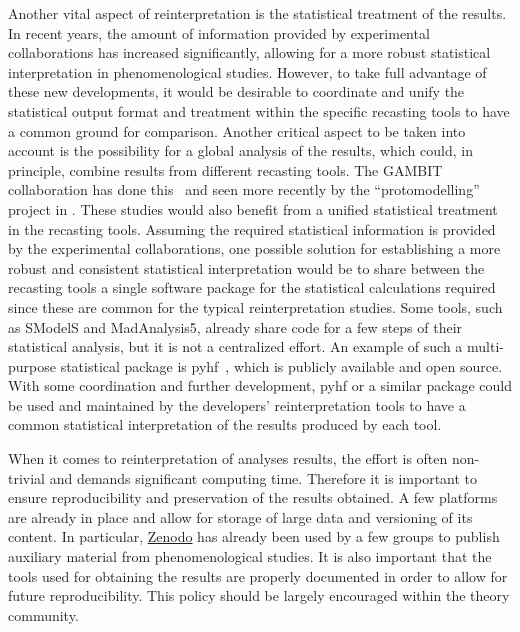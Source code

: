 \documentclass[11pt]{article}
\begin{document}
Another vital aspect of reinterpretation is the statistical treatment of the results. In recent years, the amount of information provided by experimental collaborations has increased significantly, allowing for a more robust statistical interpretation in phenomenological studies. However, to take full advantage of these new developments, it would be desirable to coordinate and unify the statistical output format and treatment within the specific recasting tools to have a common ground for comparison. Another critical aspect to be taken into account is the possibility for a global analysis of the results, which could, in principle, combine results from different recasting tools. The GAMBIT collaboration has done this~\cite{Kvellestad:2019vxm} and seen more recently by the ``protomodelling'' project in \cite{Waltenberger:2020ygp}.
These studies would also benefit from a unified statistical treatment in the recasting tools. Assuming the required statistical information is provided by the experimental collaborations, one possible solution for establishing a more robust and consistent statistical interpretation would be to share between the recasting tools a single software package for the statistical calculations required since these are common for the typical reinterpretation studies.
Some tools, such as SModelS and MadAnalysis5, already share code for a few steps of their statistical analysis, but it is not a centralized effort. An example of such a multi-purpose statistical package is pyhf~\cite{pyhf}, which is publicly available and open source. With some coordination and further development, pyhf or a similar package could be used and maintained by the developers' reinterpretation tools to have a common statistical interpretation of the results produced by each tool.




When it comes to reinterpretation of analyses results, the effort is often non-trivial and demands significant computing time. Therefore it is important to ensure reproducibility and  preservation of the results obtained.
A few platforms are already in place and allow for storage of large data and versioning of its content. In particular, \href{https://zenodo.org/}{Zenodo} has already been used by a few groups to publish auxiliary material from phenomenological studies.
It is also important that the tools used for obtaining the results are properly documented in order to allow for future reproducibility.
This policy should be largely encouraged within the theory community.
\end{document}

